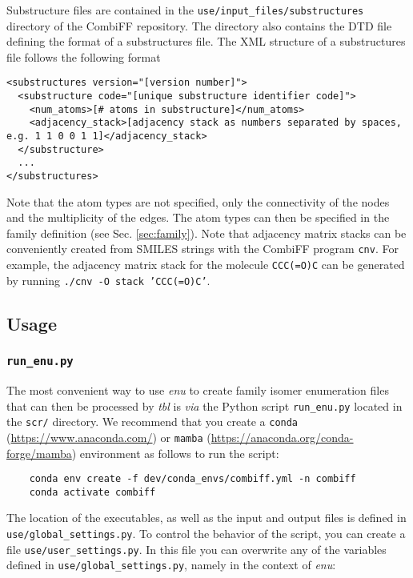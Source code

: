 \documentclass[a4paper,11pt]{article}
\begin{document}
Substructure files are contained in the \texttt{use/input\_files/substructures} directory of the CombiFF repository. The directory also contains the DTD file defining the format of a substructures file. The XML structure of a substructures file follows the following format

\begin{lstlisting}
<substructures version="[version number]">
  <substructure code="[unique substructure identifier code]">
    <num_atoms>[# atoms in substructure]</num_atoms>
    <adjacency_stack>[adjacency stack as numbers separated by spaces, e.g. 1 1 0 0 1 1]</adjacency_stack>
  </substructure>
  ...
</substructures>
\end{lstlisting}

Note that the atom types are not specified, only the connectivity of the nodes and the multiplicity of the edges. The atom types can then be specified in the family definition (see Sec. \ref{sec:family}). Note that adjacency matrix stacks can be conveniently created from SMILES strings with the CombiFF program \texttt{cnv}. For example, the adjacency matrix stack for the molecule \texttt{CCC(=O)C} can be generated by running \texttt{./cnv -O stack 'CCC(=O)C'}.

\subsection{Usage}

\subsubsection{\texttt{run\_enu.py}}

The most convenient way to use \textit{enu} to create family isomer enumeration files that can then be processed by \textit{tbl} is \textit{via} the Python script \texttt{run\_enu.py} located in the \texttt{scr/} directory. We recommend that you create a \texttt{conda} (\url{https://www.anaconda.com/}) or \texttt{mamba} (\url{https://anaconda.org/conda-forge/mamba}) environment as follows to run the script:

\begin{verbatim}
    conda env create -f dev/conda_envs/combiff.yml -n combiff
    conda activate combiff
\end{verbatim}

The location of the executables, as well as the input and output files is defined in \texttt{use/global\_settings.py}. To control the behavior of the script, you can create a file \texttt{use/user\_settings.py}. In this file you can overwrite any of the variables defined in \texttt{use/global\_settings.py}, namely in the context of \textit{enu}:
\end{document}
